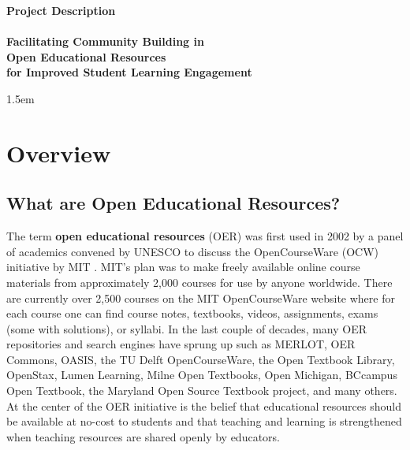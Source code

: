 \documentclass[11pt]{article}
\begin{document}
\thispagestyle{empty}
\begin{center}
\textbf{\Large Project Description}\\[0.25cm]
\hrulefill\\[0.2cm]
\textbf{\Large Facilitating Community Building in \\[0.2ex] Open Educational Resources \\[0.8ex] for Improved Student Learning Engagement}\\
\hrulefill
\end{center}
\baselineskip 1.5em

\tableofcontents

\section{Overview}

\subsection{What are Open Educational Resources?}
The term \textbf{open educational resources} (OER) was first used in 2002 by a panel of academics convened by UNESCO to discuss the OpenCourseWare (OCW) initiative by MIT \cite{unescoforum:02, oerguidelines}.  MIT's plan was to make freely available online course materials from approximately 2,000 courses for use by anyone worldwide.  There are currently over 2,500 courses on the MIT OpenCourseWare website where for each course one can find course notes, textbooks, videos, assignments, exams (some with solutions), or syllabi.  In the last couple of decades, many OER repositories and search engines have sprung up such as MERLOT, OER Commons, OASIS, the TU Delft OpenCourseWare, the Open Textbook Library, OpenStax, Lumen Learning, Milne Open Textbooks, Open Michigan, BCcampus Open Textbook, the Maryland Open Source Textbook project, and many others.  At the center of the OER initiative is the belief that educational resources should be available at no-cost to students and that teaching and learning is strengthened when teaching resources are shared openly by educators.
\end{document}
